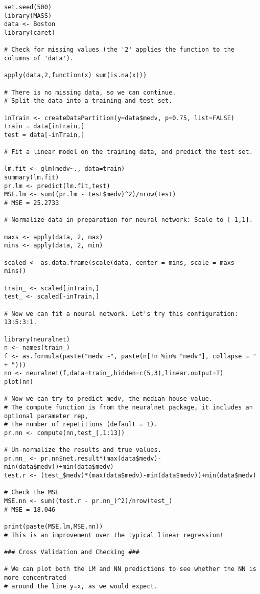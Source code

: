 \documentclass{article}
\begin{document}
\begin{verbatim}
set.seed(500)
library(MASS)
data <- Boston
library(caret)

# Check for missing values (the '2' applies the function to the columns of 'data').

apply(data,2,function(x) sum(is.na(x)))

# There is no missing data, so we can continue. 
# Split the data into a training and test set.

inTrain <- createDataPartition(y=data$medv, p=0.75, list=FALSE)
train = data[inTrain,]
test = data[-inTrain,]

# Fit a linear model on the training data, and predict the test set.

lm.fit <- glm(medv~., data=train)
summary(lm.fit)
pr.lm <- predict(lm.fit,test)
MSE.lm <- sum((pr.lm - test$medv)^2)/nrow(test)
# MSE = 25.2733

# Normalize data in preparation for neural network: Scale to [-1,1].

maxs <- apply(data, 2, max)
mins <- apply(data, 2, min)

scaled <- as.data.frame(scale(data, center = mins, scale = maxs - mins))

train_ <- scaled[inTrain,]
test_ <- scaled[-inTrain,]

# Now we can fit a neural network. Let's try this configuration: 13:5:3:1.

library(neuralnet)
n <- names(train_)
f <- as.formula(paste("medv ~", paste(n[!n %in% "medv"], collapse = " + ")))
nn <- neuralnet(f,data=train_,hidden=c(5,3),linear.output=T)
plot(nn)

# Now we can try to predict medv, the median house value.
# The compute function is from the neuralnet package, it includes an optional parameter rep,
# the number of repetitions (default = 1).
pr.nn <- compute(nn,test_[,1:13])

# Un-normalize the results and true values.
pr.nn_ <- pr.nn$net.result*(max(data$medv)-min(data$medv))+min(data$medv)
test.r <- (test_$medv)*(max(data$medv)-min(data$medv))+min(data$medv)

# Check the MSE
MSE.nn <- sum((test.r - pr.nn_)^2)/nrow(test_)
# MSE = 18.046

print(paste(MSE.lm,MSE.nn))
# This is an improvement over the typical linear regression!

### Cross Validation and Checking ###

# We can plot both the LM and NN predictions to see whether the NN is more concentrated
# around the line y=x, as we would expect.


\end{verbatim}
\end{document}
